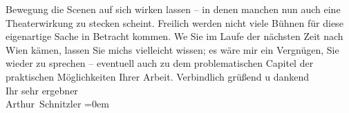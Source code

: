 \begin{ledgroupsized}[t]{13cm}
               Bewegung die Scenen auf sich wirken lassen – in denen manchen nun auch eine
               Theaterwirkung zu stecken scheint. Freilich werden nicht viele Bühnen für diese
               eigenartige Sache in Betracht kommen. We{\geminationn} Sie im Laufe
               der nächsten Zeit nach Wien kämen, lassen Sie
               michs vielleicht wissen; es wäre mir ein Vergnügen, Sie wieder zu sprechen –
               eventuell auch zu dem problematischen Capitel der praktischen Möglichkeiten Ihrer Arbeit.\pend
           \pstart
           Verbindlich grüßend u dankend{\\[\baselineskip]}Ihr sehr ergebner{\\[\baselineskip]}\spacefill\mbox{Arthur Schnitzler}\pend
           \leftskip=0em{}
         
         \endnumbering{}\end{ledgroupsized}  \newcommand{\dateiname}{L02208}\newcommand{\titel}{Arthur Schnitzler an Robert Adam, 18. 6. 1915}\newcommand{\editorInnen}{Martin Anton Müller und Gerd-Hermann Susen}
      